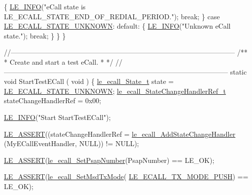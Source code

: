 \begin{DoxyCodeInclude}
{{{{{        \{
            \hyperlink{le__log_8h_a23e6d206faa64f612045d688cdde5808}{LE\_INFO}(\textcolor{stringliteral}{"eCall state is LE\_ECALL\_STATE\_END\_OF\_REDIAL\_PERIOD."});
            \textcolor{keywordflow}{break};
        \}
        \textcolor{keywordflow}{case} \hyperlink{le__ecall__interface_8h_a233609e4724e549a1405f9177c0a07dda5c06f82cbeeebb121ab56920a67dbc91}{LE\_ECALL\_STATE\_UNKNOWN}:
        \textcolor{keywordflow}{default}:
        \{
            \hyperlink{le__log_8h_a23e6d206faa64f612045d688cdde5808}{LE\_INFO}(\textcolor{stringliteral}{"Unknown eCall state."});
            \textcolor{keywordflow}{break};
        \}
    \}
\}

\textcolor{comment}{//--------------------------------------------------------------------------------------------------}\textcolor{comment}{}
\textcolor{comment}{/**}
\textcolor{comment}{ * Create and start a test eCall.}
\textcolor{comment}{ *}
\textcolor{comment}{ */}
\textcolor{comment}{//--------------------------------------------------------------------------------------------------}
\textcolor{keyword}{static} \textcolor{keywordtype}{void} StartTestECall
(
    \textcolor{keywordtype}{void}
)
\{
    \hyperlink{le__ecall__interface_8h_a233609e4724e549a1405f9177c0a07dd}{le\_ecall\_State\_t}                   state = 
      \hyperlink{le__ecall__interface_8h_a233609e4724e549a1405f9177c0a07dda5c06f82cbeeebb121ab56920a67dbc91}{LE\_ECALL\_STATE\_UNKNOWN};
    \hyperlink{le__ecall__interface_8h_a7e915557fce85b9b82017a80c0d32ddd}{le\_ecall\_StateChangeHandlerRef\_t}   stateChangeHandlerRef = 0x00;

    \hyperlink{le__log_8h_a23e6d206faa64f612045d688cdde5808}{LE\_INFO}(\textcolor{stringliteral}{"Start StartTestECall"});

    \hyperlink{le__log_8h_ac0dbbef91dc0fed449d0092ff0557b39}{LE\_ASSERT}((stateChangeHandlerRef = \hyperlink{le__ecall__interface_8h_a453b64579f2884f1d26981bca38a201c}{le\_ecall\_AddStateChangeHandler}
      (MyECallEventHandler, NULL)) != NULL);

    \hyperlink{le__log_8h_ac0dbbef91dc0fed449d0092ff0557b39}{LE\_ASSERT}(\hyperlink{le__ecall__interface_8h_abf9c09914c55cdbe72df1433f60f6e51}{le\_ecall\_SetPsapNumber}(PsapNumber) == LE\_OK);

    \hyperlink{le__log_8h_ac0dbbef91dc0fed449d0092ff0557b39}{LE\_ASSERT}(\hyperlink{le__ecall__interface_8h_a00d3dbc99884375cf2487d6640767c40}{le\_ecall\_SetMsdTxMode}(
      \hyperlink{le__ecall__interface_8h_adbaa600a7ab66371afddb909b1a113bdafe1cddc2df801a67c7f02020c0dd1127}{LE\_ECALL\_TX\_MODE\_PUSH}) == LE\_OK);

}}}}}
\end{DoxyCodeInclude}
